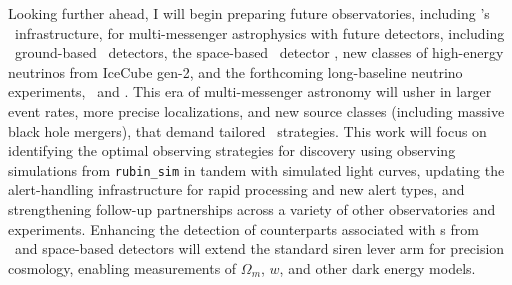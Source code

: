 Looking further ahead, I will begin preparing future observatories, including \Rubin's \ToO\ infrastructure, for multi-messenger astrophysics with future detectors, including \threeG\ ground-based \GW\ detectors, the space-based \GW\ detector \LISA, new classes of high-energy neutrinos from IceCube gen-2, and the forthcoming long-baseline neutrino experiments, \DUNE\ and \hyperk. This era of multi-messenger astronomy will usher in larger event rates, more precise localizations, and new source classes (including massive black hole mergers), that demand tailored \ToO\ strategies. This work will focus on identifying the optimal observing strategies for discovery using observing simulations from \texttt{rubin\_sim} in tandem with simulated light curves, updating the alert-handling infrastructure for rapid processing and new alert types, and strengthening follow-up partnerships across a variety of other observatories and experiments. Enhancing the detection of counterparts associated with \GW s from \threeG\ and space-based detectors will extend the standard siren lever arm for precision cosmology, enabling measurements of $\Omega_m$, $w$, and other dark energy models.